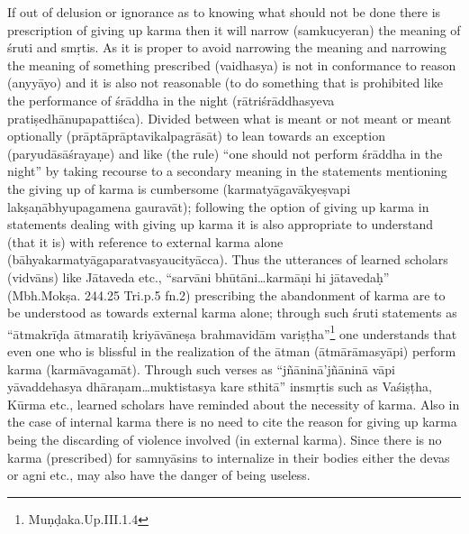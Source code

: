 If out of delusion or ignorance as to knowing what should not be done there is prescription of giving up karma then it will narrow (samkucyeran) the meaning of śruti and smṛtis. As it is proper to avoid narrowing the meaning and narrowing the meaning of something prescribed (vaidhasya) is not in conformance to reason (anyyāyo) and it is also not reasonable (to do something that is prohibited like the performance of śrāddha in the night (rātriśrāddhasyeva pratiṣedhānupapattiśca). Divided between what is meant or not meant or meant optionally (prāptāprāptavikalpagrāsāt) to lean towards an exception (paryudāsāśrayaṇe) and like (the rule) “one should not perform śrāddha in the night” by taking recourse to a secondary meaning in the statements mentioning the giving up of karma is cumbersome (karmatyāgavākyeṣvapi lakṣaṇābhyupagamena gauravāt); following the option of giving up karma in statements dealing with giving up karma it is also appropriate to understand (that it is) with reference to external karma alone (bāhyakarmatyāgaparatvasyaucityācca). Thus the utterances of learned scholars (vidvāns) like Jātaveda etc., “sarvāni bhūtāni…karmāṇi hi jātavedaḥ” (Mbh.Mokṣa. 244.25 Tri.p.5 fn.2) prescribing the abandonment of karma are to be understood as towards external karma alone; through such śruti statements as “ātmakrīḍa ātmaratiḥ kriyāvāneṣa brahmavidām variṣṭha”\footnote{Muṇḍaka.Up.III.1.4} one understands that even one who is blissful in the realization of the ātman (ātmārāmasyāpi) perform karma (karmāvagamāt). Through such verses as “jñāninā’\break jñāninā vāpi yāvaddehasya dhāraṇam…muktistasya kare sthitā” in\break smṛtis such as Vaśiṣṭha, Kūrma etc., learned scholars have reminded about the necessity of karma. Also in the case of internal karma there is no need to cite the reason for giving up karma being the discarding of violence involved (in external karma). Since there is no karma (prescribed) for samnyāsins to internalize in their bodies either the devas or agni etc., may also have the danger of being useless. 

